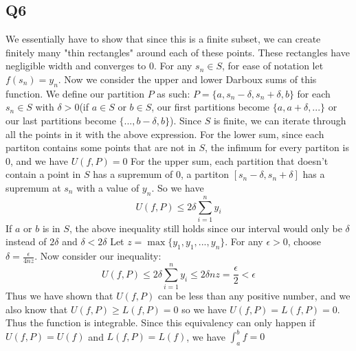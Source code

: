 \documentclass[12pt]{article}
\begin{document}
\subsection{Q6}
We essentially have to show that since this is a finite subset, we can create finitely many "thin rectangles" around each of these points. These rectangles have negligible width and converges to 0.
\newline
For any $s_n \in S$, for ease of notation let $f(s_n) = y_n$. Now we consider the upper and lower Darboux sums of this function.
\newline
We define our partition $P$ as such: $P = \{a, s_n-\delta, s_n+\delta, b \}$ for each $s_n \in S$ with $\delta>0$(if $a \in S$ or $b \in S$,
our first partitions become $\{a, a+\delta, ...\}$ or our last partitions become $\{..., b-\delta, b\}$).
Since $S$ is finite, we can iterate through all the points in it with the above expression.
\newline
For the lower sum, since each partiton contains some points that are not in $S$, the infimum for every partiton is $0$, and we have $U(f,P) = 0$
\newline
For the upper sum, each partition that doesn't contain a point in $S$ has a supremum of $0$, a partiton $[s_n-\delta, s_n+\delta]$ has a supremum at $s_n$ with a value of $y_n$. So we have
$$U(f,P) \leq 2\delta \sum_{i=1}^n y_i$$
If $a$ or $b$ is in $S$, the above inequality still holds since our interval would only be $\delta$ instead of $2\delta$ and $\delta < 2\delta$
\newline
Let $z = \max \{y_1, y_1, ..., y_n\}$. For any $\epsilon >0$, choose $\delta = \frac{\epsilon}{4nz}$. Now consider our inequality:
$$U(f,P) \leq 2\delta \sum_{i=1}^n y_i \leq 2\delta nz = \frac{\epsilon}{2} < \epsilon$$
Thus we have shown that $U(f,P)$ can be less than any positive number, and we also know that $U(f,P) \geq L(f,P)=0$ so we have $U(f,P)=L(f,P)=0$. Thus the function is integrable.
\newline
Since this equivalency can only happen if $U(f,P)=U(f)$ and $L(f,P)=L(f)$, we have $\int_a ^b f = 0$
\newpage
\end{document}
